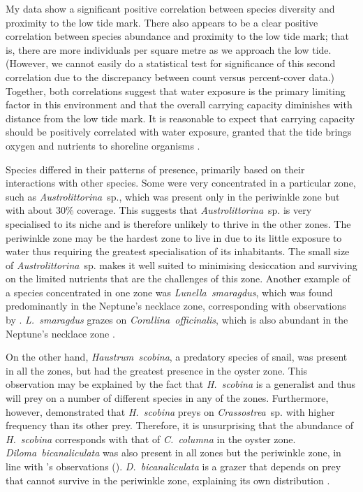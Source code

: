 \documentclass[11pt]{article}
\newcommand{\aposcite}[2]{\citeauthor{#1}'s #2 (\citeyear{#1})}
\begin{document}
	My data show a significant positive correlation between species diversity and proximity to the low tide mark. There also appears to be a clear positive correlation between species abundance and proximity to the low tide mark; that is, there are more individuals per square metre as we approach the low tide. (However, we cannot easily do a statistical test for significance of this second correlation due to the discrepancy between count versus percent-cover data.) Together, both correlations suggest that water exposure is the primary limiting factor in this environment and that the overall carrying capacity diminishes with distance from the low tide mark. It is reasonable to expect that carrying capacity should be positively correlated with water exposure, granted that the tide brings oxygen and nutrients to shoreline organisms \parencite{Armonies:2000,McLachlan:2006}.
	
	Species differed in their patterns of presence, primarily based on their interactions with other species. Some were very concentrated in a particular zone, such as \emph{Austrolittorina}~sp., which was present only in the periwinkle zone but with about 30\% coverage. This suggests that \emph{Austrolittorina}~sp. is very specialised to its niche and is therefore unlikely to thrive in the other zones. The periwinkle zone may be the hardest zone to live in due to its little exposure to water thus requiring the greatest specialisation of its inhabitants. The small size of \emph{Austrolittorina}~sp. makes it well suited to minimising desiccation and surviving on the limited nutrients that are the challenges of this zone. Another example of a species concentrated in one zone was \emph{Lunella~smaragdus}, which was found predominantly in the Neptune's necklace zone, corresponding with observations by \textcite{Morton:2004}. \emph{L.~smaragdus} grazes on \emph{Corallina~officinalis}, which is also abundant in the Neptune's necklace zone \parencite{Morton:2004}.
	
	On the other hand, \emph{Haustrum~scobina}, a predatory species of snail, was present in all the zones, but had the greatest presence in the oyster zone. This observation may be explained by the fact that \emph{H.~scobina} is a generalist and thus will prey on a number of different species in any of the zones\parencite{Novak:2010}. Furthermore, however, \textcite{Novak:2010} demonstrated that \emph{H.~scobina} preys on \emph{Crassostrea}~sp. with higher frequency than its other prey. Therefore, it is unsurprising that the abundance of \emph{H.~scobina} corresponds with that of \emph{C.~columna} in the oyster zone. \emph{Diloma~bicanaliculata} was also present in all zones but the periwinkle zone, in line with \aposcite{Morton:2004}{observations}. \emph{D.~bicanaliculata} is a grazer that depends on prey that cannot survive in the periwinkle zone, explaining its own distribution \parencite{Creese:1988}.
	
\end{document}
